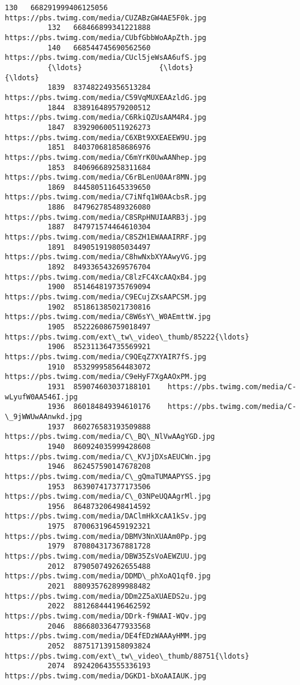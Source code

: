 \documentclass[11pt]{article}
\begin{document}
\begin{Verbatim}[commandchars=\\\{\}]
          130   668291999406125056    https://pbs.twimg.com/media/CUZABzGW4AE5F0k.jpg   
          132   668466899341221888    https://pbs.twimg.com/media/CUbfGbbWoAApZth.jpg   
          140   668544745690562560    https://pbs.twimg.com/media/CUcl5jeWsAA6ufS.jpg   
          {\ldots}                  {\ldots}                                                {\ldots}   
          1839  837482249356513284    https://pbs.twimg.com/media/C59VqMUXEAAzldG.jpg   
          1844  838916489579200512    https://pbs.twimg.com/media/C6RkiQZUsAAM4R4.jpg   
          1847  839290600511926273    https://pbs.twimg.com/media/C6XBt9XXEAEEW9U.jpg   
          1851  840370681858686976    https://pbs.twimg.com/media/C6mYrK0UwAANhep.jpg   
          1853  840696689258311684    https://pbs.twimg.com/media/C6rBLenU0AAr8MN.jpg   
          1869  844580511645339650    https://pbs.twimg.com/media/C7iNfq1W0AAcbsR.jpg   
          1886  847962785489326080    https://pbs.twimg.com/media/C8SRpHNUIAARB3j.jpg   
          1887  847971574464610304    https://pbs.twimg.com/media/C8SZH1EWAAAIRRF.jpg   
          1891  849051919805034497    https://pbs.twimg.com/media/C8hwNxbXYAAwyVG.jpg   
          1892  849336543269576704    https://pbs.twimg.com/media/C8lzFC4XcAAQxB4.jpg   
          1900  851464819735769094    https://pbs.twimg.com/media/C9ECujZXsAAPCSM.jpg   
          1902  851861385021730816    https://pbs.twimg.com/media/C8W6sY\_W0AEmttW.jpg   
          1905  852226086759018497  https://pbs.twimg.com/ext\_tw\_video\_thumb/85222{\ldots}   
          1906  852311364735569921    https://pbs.twimg.com/media/C9QEqZ7XYAIR7fS.jpg   
          1910  853299958564483072    https://pbs.twimg.com/media/C9eHyF7XgAAOxPM.jpg   
          1931  859074603037188101    https://pbs.twimg.com/media/C-wLyufW0AA546I.jpg   
          1936  860184849394610176    https://pbs.twimg.com/media/C-\_9jWWUwAAnwkd.jpg   
          1937  860276583193509888    https://pbs.twimg.com/media/C\_BQ\_NlVwAAgYGD.jpg   
          1940  860924035999428608    https://pbs.twimg.com/media/C\_KVJjDXsAEUCWn.jpg   
          1946  862457590147678208    https://pbs.twimg.com/media/C\_gQmaTUMAAPYSS.jpg   
          1953  863907417377173506    https://pbs.twimg.com/media/C\_03NPeUQAAgrMl.jpg   
          1956  864873206498414592    https://pbs.twimg.com/media/DAClmHkXcAA1kSv.jpg   
          1975  870063196459192321    https://pbs.twimg.com/media/DBMV3NnXUAAm0Pp.jpg   
          1979  870804317367881728    https://pbs.twimg.com/media/DBW35ZsVoAEWZUU.jpg   
          2012  879050749262655488    https://pbs.twimg.com/media/DDMD\_phXoAQ1qf0.jpg   
          2021  880935762899988482    https://pbs.twimg.com/media/DDm2Z5aXUAEDS2u.jpg   
          2022  881268444196462592    https://pbs.twimg.com/media/DDrk-f9WAAI-WQv.jpg   
          2046  886680336477933568    https://pbs.twimg.com/media/DE4fEDzWAAAyHMM.jpg   
          2052  887517139158093824  https://pbs.twimg.com/ext\_tw\_video\_thumb/88751{\ldots}   
          2074  892420643555336193    https://pbs.twimg.com/media/DGKD1-bXoAAIAUK.jpg   
          

\end{Verbatim}
\end{document}
